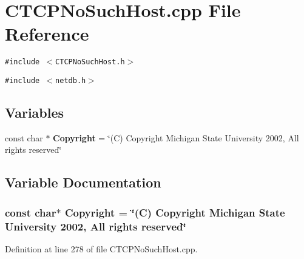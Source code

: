 \section{CTCPNo\-Such\-Host.cpp File Reference}
\label{CTCPNoSuchHost_8cpp}
{\tt \#include $<$CTCPNo\-Such\-Host.h$>$}\par
{\tt \#include $<$netdb.h$>$}\par
\subsection*{Variables}
\begin{CompactItemize}
\item 
const char $\ast$ {\bf Copyright} = \char`\"{}(C) Copyright Michigan State University 2002, All rights reserved\char`\"{}
\end{CompactItemize}


\subsection{Variable Documentation}
\subsubsection{\setlength{\rightskip}{0pt plus 5cm}const char$\ast$ Copyright = \char`\"{}(C) Copyright Michigan State University 2002, All rights reserved\char`\"{}\hspace{0.3cm}{\tt  [static]}}\label{CTCPNoSuchHost_8cpp_a0}




Definition at line 278 of file CTCPNo\-Such\-Host.cpp.